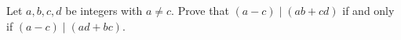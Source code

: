 Let $a,b,c,d$ be integers with $a\ne c$. Prove that $(a-c)\mid(ab+cd)$ if and only if $(a-c)\mid(ad+bc)$.
